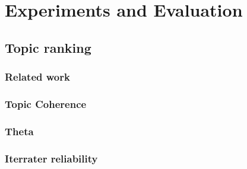 \chapter{Experiments and Evaluation}
\section{Topic ranking}


\subsection{Related work}

\subsection{Topic Coherence}

\subsection{Theta}

\subsection{Iterrater reliability}


